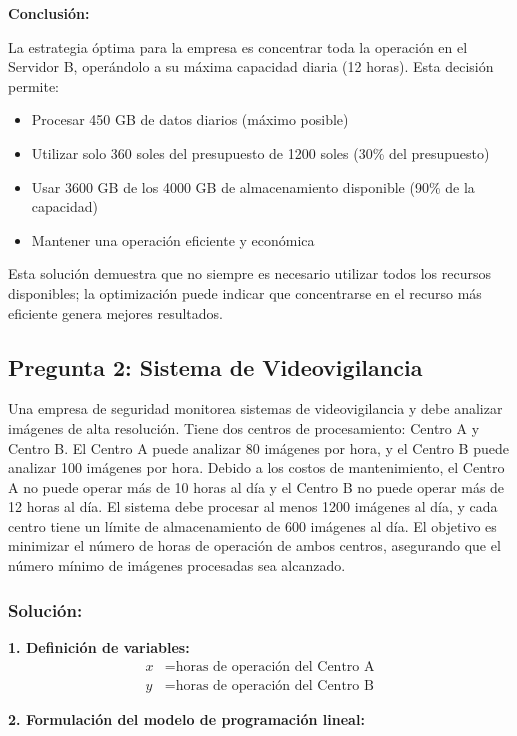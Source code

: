 \documentclass[12pt,a4paper]{article}
\begin{document}
\textbf{Conclusión:}

La estrategia óptima para la empresa es concentrar toda la operación en el Servidor B, operándolo a su máxima capacidad diaria (12 horas). Esta decisión permite:
\begin{itemize}
\item Procesar 450 GB de datos diarios (máximo posible)
\item Utilizar solo 360 soles del presupuesto de 1200 soles (30\% del presupuesto)
\item Usar 3600 GB de los 4000 GB de almacenamiento disponible (90\% de la capacidad)
\item Mantener una operación eficiente y económica
\end{itemize}

Esta solución demuestra que no siempre es necesario utilizar todos los recursos disponibles; la optimización puede indicar que concentrarse en el recurso más eficiente genera mejores resultados.

\subsection*{Pregunta 2: Sistema de Videovigilancia}

Una empresa de seguridad monitorea sistemas de videovigilancia y debe analizar imágenes de alta resolución. Tiene dos centros de procesamiento: Centro A y Centro B. El Centro A puede analizar 80 imágenes por hora, y el Centro B puede analizar 100 imágenes por hora. Debido a los costos de mantenimiento, el Centro A no puede operar más de 10 horas al día y el Centro B no puede operar más de 12 horas al día. El sistema debe procesar al menos 1200 imágenes al día, y cada centro tiene un límite de almacenamiento de 600 imágenes al día. El objetivo es minimizar el número de horas de operación de ambos centros, asegurando que el número mínimo de imágenes procesadas sea alcanzado.

\subsubsection*{Solución:}

\textbf{1. Definición de variables:}
\begin{align}
x &= \text{horas de operación del Centro A}\\
y &= \text{horas de operación del Centro B}
\end{align}

\textbf{2. Formulación del modelo de programación lineal:}
\end{document}
